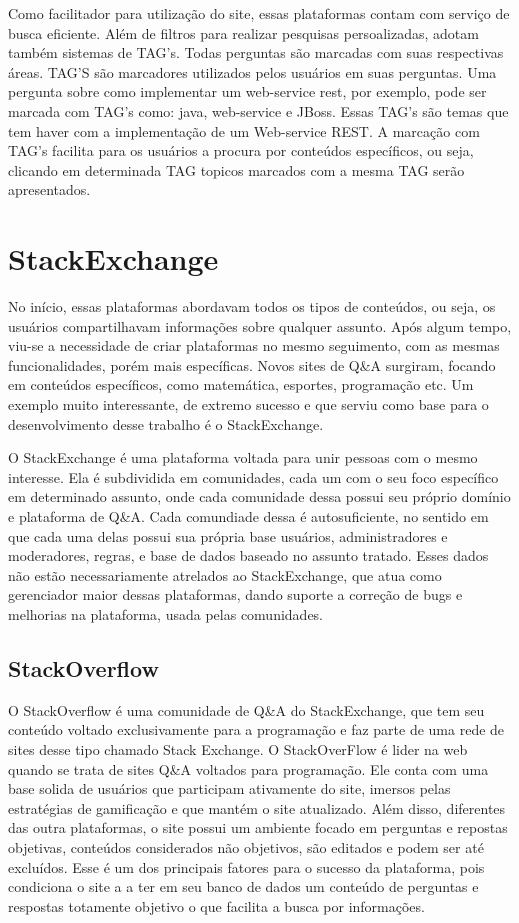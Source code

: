 Como facilitador para utilização do site, essas plataformas contam com serviço de busca eficiente. Além de filtros para realizar pesquisas persoalizadas, adotam também sistemas de TAG's. Todas perguntas são marcadas com suas respectivas áreas.
TAG'S são marcadores utilizados pelos usuários em suas perguntas. Uma pergunta sobre como implementar um web-service rest, por exemplo, pode ser marcada com TAG's como: java, web-service e JBoss. Essas TAG's são temas que tem haver com a implementação de 
um Web-service REST. A marcação com TAG's facilita para os usuários a procura por conteúdos específicos, ou seja, clicando em determinada TAG topicos marcados com a mesma TAG serão apresentados.

\section{StackExchange}%

No início, essas plataformas abordavam todos os tipos de conteúdos, ou seja, os usuários compartilhavam informações sobre qualquer assunto. Após algum tempo, viu-se a necessidade de criar plataformas no mesmo seguimento, com as mesmas
 funcionalidades, porém mais específicas. Novos sites de Q\&A surgiram, focando em conteúdos específicos, como matemática, esportes, programação etc. Um exemplo muito interessante, de extremo sucesso e que serviu como base para o desenvolvimento
 desse trabalho é o StackExchange.

O StackExchange é uma plataforma voltada para unir pessoas com o mesmo interesse. Ela é subdividida em comunidades, cada um com o seu foco específico em determinado assunto, onde cada comunidade dessa possui seu próprio domínio e plataforma de Q\&A. Cada comundiade dessa é autosuficiente, no sentido em que cada uma delas possui sua própria base usuários, administradores e moderadores, regras, e base de dados baseado no assunto tratado. Esses dados não estão necessariamente atrelados ao StackExchange, que atua como gerenciador maior dessas plataformas, dando suporte a correção de bugs e melhorias na plataforma, usada pelas comunidades.



\subsection{StackOverflow}%

O StackOverflow é uma comunidade de Q\&A do StackExchange, que tem seu conteúdo voltado exclusivamente para a programação e faz parte de uma rede de sites desse tipo chamado Stack Exchange. O StackOverFlow é lider na web quando se trata de sites Q\&A voltados para programação.
Ele conta com uma base solida de usuários que participam ativamente do site, imersos pelas estratégias de gamificação e que mantém o site atualizado. Além disso, diferentes das outra plataformas, o site possui um ambiente focado em perguntas e repostas objetivas,
conteúdos considerados não objetivos, são editados e podem ser até excluídos. Esse é um dos principais fatores para o sucesso da plataforma, pois condiciona o site a a ter em seu banco de dados um conteúdo de perguntas e respostas totamente objetivo o que facilita
 a busca por informações. 


